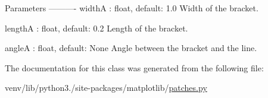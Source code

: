 \begin{DoxyVerb}Parameters
----------
widthA : float, default: 1.0
    Width of the bracket.

lengthA : float, default: 0.2
    Length of the bracket.

angleA : float, default: None
    Angle between the bracket and the line.
\end{DoxyVerb}
 

The documentation for this class was generated from the following file\+:\begin{DoxyCompactItemize}
\item 
venv/lib/python3./site-\/packages/matplotlib/\hyperlink{patches_8py}{patches.\+py}\end{DoxyCompactItemize}
